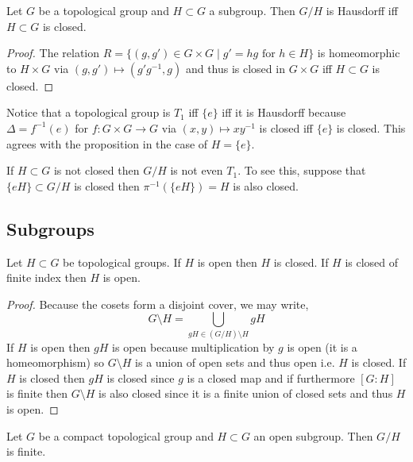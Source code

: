\documentclass[12pt]{extarticle}
\begin{document}
\begin{prop}
Let $G$ be a topological group and $H \subset G$ a subgroup. Then $G / H$ is Hausdorff iff $H \subset G$ is closed.
\end{prop}

\begin{proof}
The relation $R = \{ (g, g') \in G \times G \mid g' = h g \text{ for } h \in H \}$ is homeomorphic to $H \times G$ via $(g, g') \mapsto (g' g^{-1}, g)$ and thus is closed in $G \times G$ iff $H \subset G$ is closed.
\end{proof}

\begin{rmk}
Notice that a topological group is $T_1$ iff $\{ e \}$ iff it is Hausdorff because $\Delta = f^{-1}(e)$ for $f : G \times G \to G$ via $(x,y) \mapsto xy^{-1}$ is closed iff $\{ e \}$ is closed. This agrees with the proposition in the case of $H = \{ e \}$.
\end{rmk}

\begin{rmk}
If $H \subset G$ is not closed then $G/H$ is not even $T_1$. To see this, suppose that $\{ eH \} \subset G/H$ is closed then $\pi^{-1}(\{ e H \}) = H$ is also closed.
\end{rmk}

\subsection{Subgroups}


\begin{proposition}
Let $H \subset G$ be topological groups. If $H$ is open then $H$ is closed. If $H$ is closed of finite index then $H$ is open.
\end{proposition}

\begin{proof}
Because the cosets form a disjoint cover, we may write,
\[ G \setminus H = \bigcup_{g H \in (G / H) \setminus H} g H \]
If $H$ is open then $g H$ is open because multiplication by $g$ is open (it is a homeomorphism) so $G \setminus H$ is a union of open sets and thus open i.e. $H$ is closed. If $H$ is closed then $g H$ is closed since $g$ is a closed map and if furthermore $[G : H]$ is finite then $G \setminus H$ is also closed since it is a finite union of closed sets and thus $H$ is open. 
\end{proof}

\begin{proposition}
Let $G$ be a compact topological group and $H \subset G$ an open subgroup. Then $G / H$ is finite.
\end{proposition}
\end{document}
